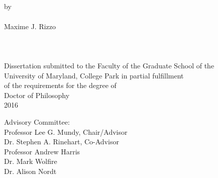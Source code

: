 \documentclass[
12pt, %
english, %
doublespacing, %
nolistspacing, %
liststotoc, %
toctotoc, %
headsepline, %
]{MastersDoctoralThesis} %
\renewcommand{\baselinestretch}{2}
\begin{document}
 
 

 \begin{titlepage}

\hbox{\ }
\vspace{1in}
\renewcommand{\baselinestretch}{1}
\small\normalsize
\begin{center}

\large{\ttitle }\\

\ \\
\ \\
\large{by} \\
\ \\
\large{Maxime J. Rizzo}%
\ \\
\ \\
\ \\
\ \\
\normalsize
Dissertation submitted to the Faculty of the Graduate School of the \\
University of Maryland, College Park in partial fulfillment \\
of the requirements for the degree of \\
Doctor of Philosophy \\
2016

\vspace{7.5em}
\end{center}

\noindent Advisory Committee: \\
Professor Lee G. Mundy, Chair/Advisor \\
Dr. Stephen A. Rinehart, Co-Advisor \\
Professor Andrew Harris \\
Dr. Mark Wolfire \\
Dr. Alison Nordt

\end{titlepage}
\end{document}
